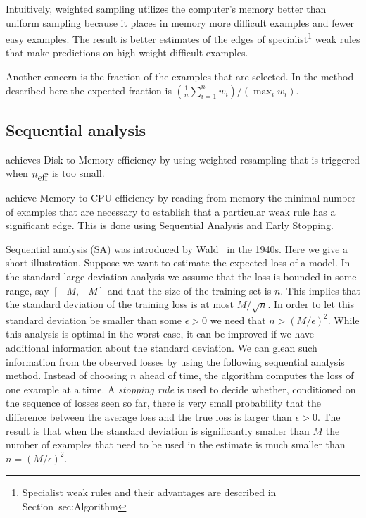 Intuitively, weighted sampling utilizes the computer's memory better
than uniform sampling because it places in memory more difficult
examples and fewer easy examples. The result is better estimates of
the edges of specialist\footnote{Specialist weak rules and their
  advantages are described in Section~{sec:Algorithm}} weak rules that
make predictions on high-weight difficult examples.


Another concern is the fraction of the examples that are selected. In
the method described here the expected fraction is $(\frac{1}{n}
\sum_{i=1}^n w_i)/(\max_i w_i)$.

\subsection{Sequential analysis}

\Sparrow achieves Disk-to-Memory efficiency by using weighted
resampling that is triggered when ${n_{\mbox{eff}}}$ is too small.

\Sparrow achieve Memory-to-CPU efficiency by reading from memory the
minimal number of examples that are necessary to establish that a
particular weak rule has a significant edge. This is done using
Sequential Analysis and Early Stopping.

Sequential analysis (SA) was introduced by
Wald~\cite{wald_sequential_1973} in the 1940s.  Here we give a short
illustration. Suppose we want to estimate the expected loss of a
model. In the standard large deviation analysis we assume that the
loss is bounded in some range, say $[-M,+M]$ and that the size of the
training set is $n$. This implies that the standard deviation of the
training loss is at most $M/\sqrt{n}$. In order to let this standard
deviation be smaller than some $\epsilon>0$ we need that $n >
(M/\epsilon)^2$. While this analysis is optimal in the worst case, it
can be improved if we have additional information about the standard
deviation. We can glean such information from the observed losses by
using the following sequential analysis method. Instead of choosing
$n$ ahead of time, the algorithm computes the loss of one example at a
time. A {\em stopping rule} is used to decide whether, conditioned on
the sequence of losses seen so far, there is very small probability
that the difference between the average loss and the true loss is
larger than $\epsilon>0$. The result is that when the standard
deviation is significantly smaller than $M$ the number of examples
that need to be used in the estimate is much smaller than
$n=(M/\epsilon)^2$.

